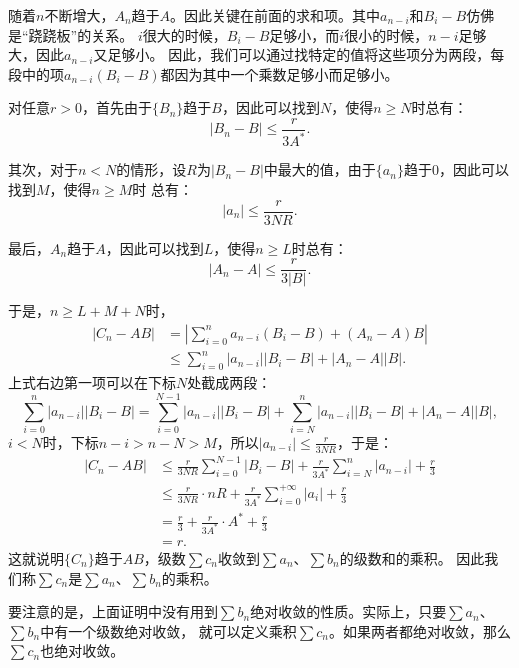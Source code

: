 \documentclass[12pt,UTF8]{ctexbook}
\theoremstyle{definition}
\theoremstyle{plain}
\begin{document}
随着$n$不断增大，$A_n$趋于$A$。因此关键在前面的求和项。其中$a_{n-i}$和$B_i - B$仿佛是“跷跷板”的关系。
$i$很大的时候，$B_i - B$足够小，而$i$很小的时候，$n-i$足够大，因此$a_{n-i}$又足够小。
因此，我们可以通过找特定的值将这些项分为两段，每段中的项$a_{n-i} (B_i - B)$都因为其中一个乘数足够小而足够小。

对任意$r>0$，首先由于$\{B_n\}$趋于$B$，因此可以找到$N$，使得$n\geqslant N$时总有：
$$ |B_n - B| \leqslant \frac{r}{3A^*}. $$

其次，对于$n<N$的情形，设$R$为$|B_n-B|$中最大的值，由于$\{a_n\}$趋于$0$，因此可以找到$M$，使得$n\geqslant M$时
总有：
$$ |a_n| \leqslant \frac{r}{3NR}.$$

最后，$A_n$趋于$A$，因此可以找到$L$，使得$n\geqslant L$时总有：
$$ |A_n - A| \leqslant \frac{r}{3|B|}.$$

于是，$n\geqslant L+M+N$时，
\begin{align*}
    |C_n - AB| &= \left|\sum_{i=0}^{n} a_{n-i} (B_i - B) + (A_n - A) B \right| \\
    &\leqslant  \sum_{i=0}^{n} |a_{n-i} ||B_i - B | + |A_n - A| |B|. 
\end{align*}
上式右边第一项可以在下标$N$处截成两段：
$$ \sum_{i=0}^{n} |a_{n-i} ||B_i - B | = \sum_{i=0}^{N-1} |a_{n-i}| |B_i - B| + \sum_{i=N}^{n} |a_{n-i}| |B_i - B| + |A_n - A| |B|,$$
$i<N$时，下标$n-i > n-N >M$，所以$|a_{n-i}| \leqslant \frac{r}{3NR}$，于是：
\begin{align*}
    |C_n - AB| &\leqslant \frac{r}{3NR} \sum_{i=0}^{N-1} |B_i - B| + \frac{r}{3A^*} \sum_{i=N}^{n} |a_{n-i}| + \frac{r}{3} \\
    &\leqslant \frac{r}{3NR} \cdot nR +  \frac{r}{3A^*} \sum_{i=0}^{+\infty} |a_i| + \frac{r}{3} \\
    &= \frac{r}{3} + \frac{r}{3A^*}\cdot A^* + \frac{r}{3} \\
    &= r.
\end{align*}
这就说明$\{C_n\}$趋于$AB$，级数$\sum c_n$收敛到$\sum a_n$、$\sum b_n$的级数和的乘积。
因此我们称$\sum c_n$是$\sum a_n$、$\sum b_n$的乘积。

要注意的是，上面证明中没有用到$\sum b_n$绝对收敛的性质。实际上，只要$\sum a_n$、$\sum b_n$中有一个级数绝对收敛，
就可以定义乘积$\sum c_n$。如果两者都绝对收敛，那么$\sum c_n$也绝对收敛。

\end{document}
